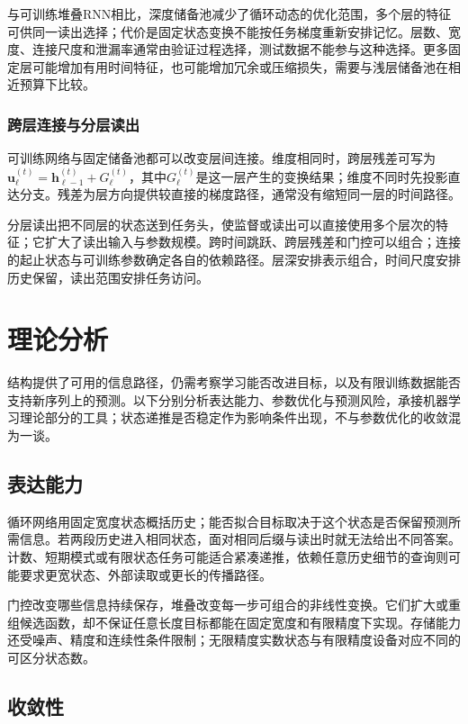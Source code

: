 与可训练堆叠RNN相比，深度储备池减少了循环动态的优化范围，多个层的特征可供同一读出选择；代价是固定状态变换不能按任务梯度重新安排记忆。层数、宽度、连接尺度和泄漏率通常由验证过程选择，测试数据不能参与这种选择。更多固定层可能增加有用时间特征，也可能增加冗余或压缩损失，需要与浅层储备池在相近预算下比较。

\subsubsection{跨层连接与分层读出}
\label{sec:rnn-depth-connections}

可训练网络与固定储备池都可以改变层间连接。维度相同时，跨层残差可写为$\bm u_\ell^{(t)}=\bm h_{\ell-1}^{(t)}+G_\ell^{(t)}$，其中$G_\ell^{(t)}$是这一层产生的变换结果；维度不同时先投影直达分支。残差为层方向提供较直接的梯度路径，通常没有缩短同一层的时间路径。

分层读出把不同层的状态送到任务头，使监督或读出可以直接使用多个层次的特征；它扩大了读出输入与参数规模。跨时间跳跃、跨层残差和门控可以组合；连接的起止状态与可训练参数确定各自的依赖路径。层深安排表示组合，时间尺度安排历史保留，读出范围安排任务访问。

\section{理论分析}
\label{sec:rnn-theory}

结构提供了可用的信息路径，仍需考察学习能否改进目标，以及有限训练数据能否支持新序列上的预测。以下分别分析表达能力、参数优化与预测风险，承接机器学习理论部分的工具；状态递推是否稳定作为影响条件出现，不与参数优化的收敛混为一谈。

\subsection{表达能力}
\label{sec:rnn-expressivity}

循环网络用固定宽度状态概括历史；能否拟合目标取决于这个状态是否保留预测所需信息。若两段历史进入相同状态，面对相同后缀与读出时就无法给出不同答案。计数、短期模式或有限状态任务可能适合紧凑递推，依赖任意历史细节的查询则可能要求更宽状态、外部读取或更长的传播路径。

门控改变哪些信息持续保存，堆叠改变每一步可组合的非线性变换。它们扩大或重组候选函数，却不保证任意长度目标都能在固定宽度和有限精度下实现。存储能力还受噪声、精度和连续性条件限制；无限精度实数状态与有限精度设备对应不同的可区分状态数。

\subsection{收敛性}
\label{sec:rnn-convergence}

